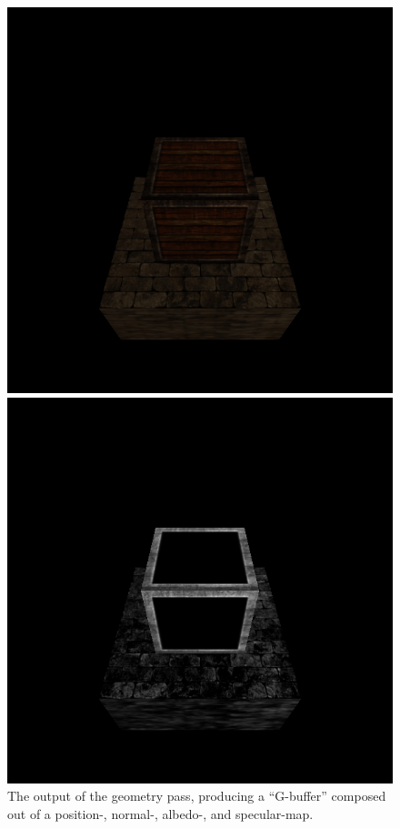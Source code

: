 \documentclass[format=sigconf]{acmart}
\begin{document}
\begin{figure}[H]
\begin{center}
\begin{minipage}{.2\textwidth}
    \end{minipage}
    \vskip0.04cm
    \begin{minipage}{.2\textwidth}
      \includegraphics[width=1.0\textwidth]{pipeline-albedo.png}
    \end{minipage}
    \begin{minipage}{.2\textwidth}
      \includegraphics[width=1.0\textwidth]{pipeline-specular.png}
    \end{minipage}
  \end{center}
  \caption{The output of the geometry pass, producing a ``G-buffer'' composed out of a position-, normal-, albedo-, and specular-map.}
  \label{fig:pipeline-gbuffer}
\end{figure}
\end{document}
